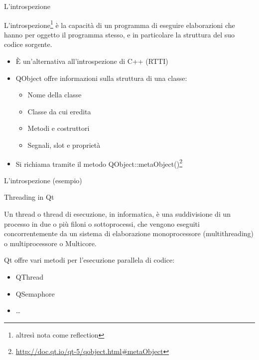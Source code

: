 \documentclass[10pt]{beamer}
\begin{document}
\begin{frame}{L'introspezione}
	\begin{block}{}
		L'introspezione\footnote{altresì nota come reflection} è la capacità di un programma di eseguire elaborazioni che hanno per oggetto il programma stesso, e in particolare la struttura del suo codice sorgente.
	\end{block}	
	
	\begin{itemize}
		\item È un’alternativa all'introspezione di C++ (RTTI)
		\item {\ttfamily QObject} offre informazioni sulla struttura di una classe:
		\begin{itemize}
			\item Nome della classe
			\item Classe da cui eredita
			\item Metodi e costruttori
			\item Segnali, slot e proprietà
		\end{itemize}
		\item Si richiama tramite il metodo {\ttfamily QObject::metaObject()}\footnote{\url{http://doc.qt.io/qt-5/qobject.html\#metaObject}}
	\end{itemize}
\end{frame}


\begin{frame}{L'introspezione (esempio)}
	\begin{block}{}
		\lst
	\end{block}
\end{frame}

\begin{frame}{Threading in Qt}
	\begin{block}{}
		Un thread o thread di esecuzione, in informatica, è una suddivisione di un processo in due o più filoni o sottoprocessi, che vengono eseguiti concorrentemente da un sistema di elaborazione monoprocessore (multithreading) o multiprocessore o Multicore.
	\end{block}
	\bigskip
	Qt offre vari metodi per l'esecuzione parallela di codice:
	\begin{itemize}
		\item {\ttfamily QThread}
		\item {\ttfamily QSemaphore}
		\item \dots
	\end{itemize}
	
\end{frame}
\end{document}
